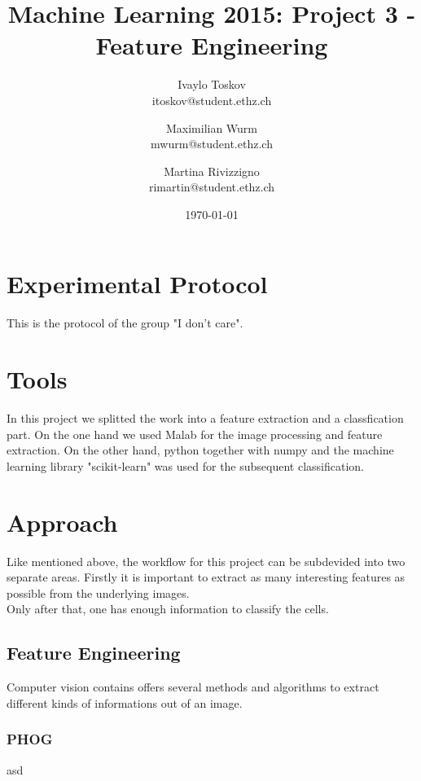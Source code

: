 \documentclass[a4paper, 11pt]{article}
\title{Machine Learning 2015: Project 3 - Feature Engineering}
\author{Ivaylo Toskov \\ itoskov@student.ethz.ch \and Maximilian Wurm \\ mwurm@student.ethz.ch \and 
	Martina Rivizzigno \\ rimartin@student.ethz.ch\\}
\date{\today}
\begin{document}
	\maketitle
	
	\section*{Experimental Protocol}
	This is the protocol of the group "I don't care".
	
	\section{Tools}
	In this project we splitted the work into a feature extraction and a classfication part.
	On the one hand we used Malab	for the image processing and feature extraction. 
	On the other hand, python together with numpy and the machine learning library "scikit-learn" was used for the subsequent classification.

	
	\section{Approach}
	Like mentioned above, the workflow for this project can be subdevided into two separate areas. 
	Firstly it is important to extract as many interesting features as possible from the underlying images. \\
	Only after that, one has enough information to classify the cells.

	
	\subsection{Feature Engineering}
	Computer vision contains offers several methods and algorithms to extract different kinds of informations out of an image. 
	\subsubsection{PHOG}
asd
\end{document}
